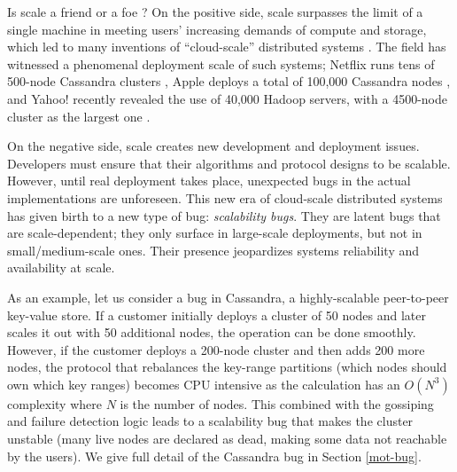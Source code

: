 Is scale a friend or a foe \cite{Ousterhout+11-ScaleFriendEnemy}?
On the positive side, scale surpasses the limit of a single machine in
meeting users' increasing demands of compute and storage, which led to
many inventions of ``cloud-scale'' distributed systems
\cite{Chang+06-BigTable, 
DeanGhemawat04-MapReduce, 
DeCandia+07-Dynamo,
Ghemawat+03-GoogleFS, 
Hindman+11-Mesos,
Verma+15-Borg}.  The field has witnessed a
phenomenal deployment scale of such systems;
%
Netflix runs tens of 500-node Cassandra clusters \cite{RunningNetflix13},
Apple deploys a total of 100,000 Cassandra nodes \cite{WikiCassandra}, 
and Yahoo! recently revealed the use of 40,000 Hadoop servers,
with a 4500-node cluster as the largest one \cite{LargestHadoop}.

On the negative side, scale creates new development and deployment issues.
Developers must ensure that their algorithms and protocol designs
to be scalable.
However, until real deployment takes place, unexpected bugs 
in the actual implementations are unforeseen.
This new era of cloud-scale distributed systems has given birth
to a new type of bug: {\em scalability bugs}.  They are latent bugs that
are scale-dependent; they only surface in large-scale deployments, but not
in small/medium-scale ones.  Their presence jeopardizes systems
reliability and availability at scale.

As an example, let us consider a bug in Cassandra, a
highly-scalable peer-to-peer key-value store.  If a customer initially
deploys a cluster of 50 nodes and later scales it out with 50 additional
nodes, the operation can be done smoothly.  However, if the customer
deploys a 200-node cluster and then adds 200 more nodes, the protocol that
rebalances the key-range partitions (which nodes should own which key
ranges) becomes CPU intensive as the calculation has an $O(N^3)$
complexity where $N$ is the number of nodes.  This combined with the
gossiping and failure detection logic leads to a scalability bug that
makes the cluster unstable (many live nodes are declared as dead, making
some data not reachable by the users). We give full detail of the Cassandra bug
in Section \ref{mot-bug}.

